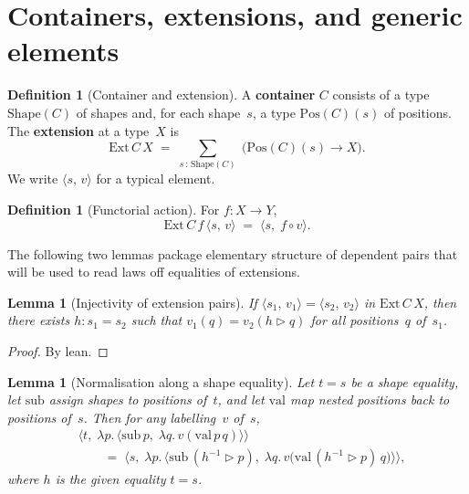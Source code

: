 \documentclass[11pt,a4paper]{article}
\theoremstyle{plain}
\newtheorem{lemma}[theorem]{Lemma}
\theoremstyle{definition}
\newtheorem{definition}[theorem]{Definition}
\newcommand{\Ext}{\mathrm{Ext}}
\newcommand{\Shape}{\mathrm{Shape}}
\newcommand{\Pos}{\mathrm{Pos}}
\begin{document}
\section{Containers, extensions, and generic elements}

\begin{definition}[Container and extension]
A \textbf{container} $C$ consists of a type $\Shape(C)$ of shapes and, for
each shape~$s$, a type $\Pos(C)(s)$ of positions. The \textbf{extension} at a
type~$X$ is
\begin{equation}
  \Ext\,C\,X \;=\; \sum_{s \,:\, \Shape(C)}\;
    \bigl(\Pos(C)(s) \to X\bigr).
\end{equation}
We write $\langle s,\, v\rangle$ for a typical element.
\end{definition}

\begin{definition}[Functorial action]
For $f : X \to Y$,
\begin{equation}
  \Ext\,C\,f\,\bigl\langle s,\, v\bigr\rangle
  \;=\;
  \bigl\langle s,\; f \circ v\bigr\rangle.
\end{equation}
\end{definition}

The following two lemmas package elementary structure of dependent pairs that
will be used to read laws off equalities of extensions.

\begin{lemma}[Injectivity of extension pairs]\label{lem:mk-inj}
If $\langle s_1,\, v_1\rangle = \langle s_2,\, v_2\rangle$ in $\Ext\,C\,X$,
then there exists $h : s_1 = s_2$ such that
$v_1(q) = v_2(h \mathbin{\triangleright} q)$ for all positions~$q$ of~$s_1$.
\end{lemma}

\begin{proof}
By lean.
\end{proof}

\begin{lemma}[Normalisation along a shape equality]\label{lem:norm-aux}
Let $t = s$ be a shape equality, let $\mathrm{sub}$ assign shapes to positions
of~$t$, and let $\mathrm{val}$ map nested positions back to positions of~$s$.
Then for any labelling~$v$ of~$s$,
\begin{equation}
\begin{aligned}
  &\bigl\langle t,\;
    \lambda p.\,
      \bigl\langle \mathrm{sub}\,p,\;
        \lambda q.\, v(\mathrm{val}\,p\,q)\bigr\rangle
  \bigr\rangle \\
  &\qquad=\;
  \bigl\langle s,\;
    \lambda p.\,
      \bigl\langle \mathrm{sub}\,(h^{-1} \mathbin{\triangleright} p),\;
        \lambda q.\,
          v\bigl(\mathrm{val}\,(h^{-1} \mathbin{\triangleright} p)\,q\bigr)
      \bigr\rangle
  \bigr\rangle,
\end{aligned}
\end{equation}
where $h$ is the given equality $t = s$.
\end{lemma}
\end{document}
